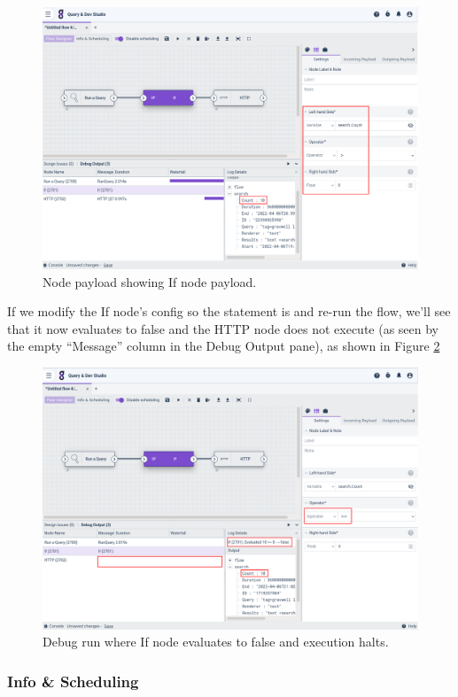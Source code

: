 \begin{figure}
	\includegraphics[width=0.85\linewidth]{images/if-payload.png}
	\caption{Node payload showing If node payload.}
	\label{fig:if-payload}
\end{figure}

If we modify the If node's config so the statement is  and re-run the flow, we'll see that it now evaluates to false and the HTTP node does not execute (as seen by the empty ``Message'' column in the Debug Output pane), as shown in Figure \ref{fig:if-false}

\begin{figure}
	\includegraphics[width=0.85\linewidth]{images/if-false.png}
	\caption{Debug run where If node evaluates to false and execution halts.}
	\label{fig:if-false}
\end{figure}

\subsubsection{Info \& Scheduling}

